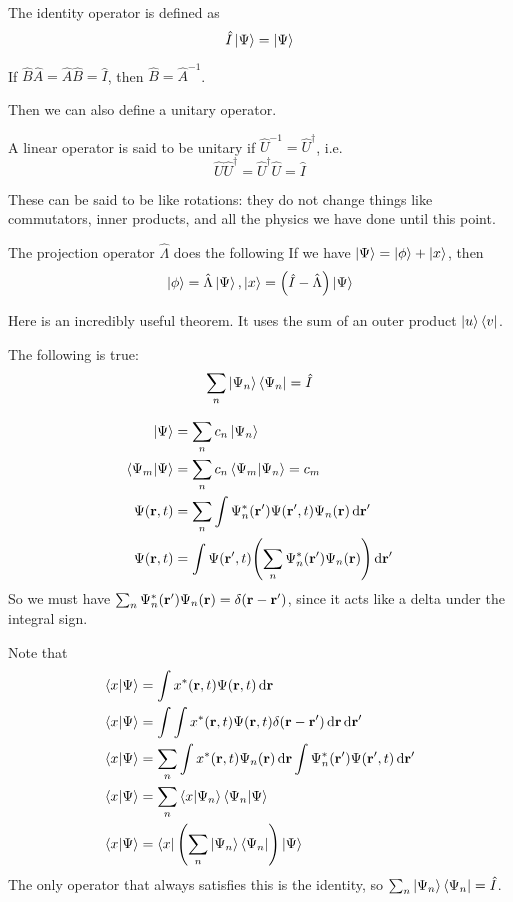\begin{definition}
    The identity operator is defined as
    \[ \hat{I} \ket{\Psi} = \ket{\Psi} \]

    If $\hat{B}\hat{A} = \hat{A}\hat{B} = \hat{I}$, then $\hat{B} = \hat{A}^{-1}$.
\end{definition}
Then we can also define a unitary operator.
\begin{definition}
    A linear operator is said to be unitary if $\hat{U}^{-1} = \hat{U}^{\dagger}$, i.e.
    \[ \hat{U} \hat{U}^{\dagger} = \hat{U}^{\dagger} \hat{U} = \hat{I} \]
\end{definition}
These can be said to be like rotations: they do not change things like commutators, inner products, and all
the physics we have done until this point.
\begin{definition}
    The projection operator $\hat{\Lambda}$ does the following If we have $\ket{\Psi} = \ket{\phi} + \ket{x}$,
    then
    \[ \ket{\phi} = \hat{\Lambda} \ket{\Psi}, \ket{x} = \qty(\hat{I} - \hat{\Lambda})\ket{\Psi} \]
\end{definition}
Here is an incredibly useful theorem. It uses the sum of an outer product $\ket{u}\bra{v}$.
\begin{theorem}
    The following is true:
    \[ \sum_n \ket{\Psi_n}\bra{\Psi_n} = \hat{I} \]

    \begin{proof*}
    \begin{align*} 
        \ket{\Psi} &= \sum_n c_n \ket{\Psi_n} \\
        \bra{\Psi_m}\ket{\Psi } &= \sum_n c_n \bra{\Psi_m} \ket{\Psi_n} = c_m \\
        \Psi(\mathbf{r}, t) &= \sum_{n} \int \Psi^*_n(\mathbf{r'}) \Psi(\mathbf{r'}, t) \Psi_n(\mathbf{r}) \dd{\mathbf{r'}} \\
        \Psi(\mathbf{r}, t) &= \int \Psi(\mathbf{r'}, t) \qty(\sum_{n} \Psi^*_n(\mathbf{r'}) \Psi_n(\mathbf{r})) \dd{\mathbf{r'}} \\
    \end{align*}
    So we must have $\sum_n  \Psi^*_n(\mathbf{r'}) \Psi_n(\mathbf{r}) = \delta(\mathbf{r} - \mathbf{r'})$,
    since it acts like a delta under the integral sign.

    Note that
    \begin{align*}
        \bra{x}\ket{\Psi} &= \int x^*(\mathbf{r}, t) \Psi(\mathbf{r}, t) \dd{\mathbf{r}} \\
        \bra{x}\ket{\Psi}&= \int \int x^*(\mathbf{r}, t) \Psi(\mathbf{r}, t) \delta(\mathbf{r} - \mathbf{r}') \dd{\mathbf{r}} \dd{\mathbf{r'}} \\
        \bra{x}\ket{\Psi}&= \sum_n \int x^*(\mathbf{r}, t) \Psi_n(\mathbf{r}) \dd{\mathbf{r}} \int \Psi_n^*(\mathbf{r'}) \Psi(\mathbf{r'}, t) \dd{\mathbf{r'}} \\
        \bra{x}\ket{\Psi} &= \sum_n \bra{x}\ket{\Psi_n}\bra{\Psi_n}\ket{\Psi} \\
        \bra{x}\ket{\Psi} &= \bra{x} \qty(\sum_n \ket{\Psi_n} \bra{\Psi_n})\ket{\Psi}
    \end{align*}
    The only operator that always satisfies this is the identity, so $\sum_n \ket{\Psi_n} \bra{\Psi_n} = \hat{I}$.
\end{proof*} 
\end{theorem}